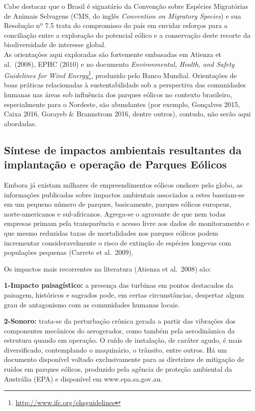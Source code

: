 \documentclass[
  oneside]{scrbook}
\DeclareRobustCommand{\href}[2]{#2\footnote{\url{#1}}}
\begin{document}
Cabe destacar que o Brasil é signatário da Convenção sobre Espécies Migratórias de Animais Selvagens (CMS, do inglês \emph{Convention on Migratory Species}) e sua Resolução nº 7.5 trata do compromisso do país em envidar esforços para a conciliação entre a exploração do potencial eólico e a conservação deste recorte da biodiversidade de interesse global.\\
As orientações aqui exploradas são fortemente embasadas em Atienza et al.~(2008), EPHC (2010) e no documento \href{http://www.ifc.org/ehsguidelines}{\emph{Environmental, Health, and Safety Guidelines for Wind Energy}}, produzido pelo Banco Mundial. Orientações de boas práticas relacionadas à sustentabilidade sob a perspectiva das comunidades humanas nas áreas sob influência dos parques eólicos no contexto brasileiro, especialmente para o Nordeste, são abundantes (por exemplo, Gonçalves 2015, Caixa 2016, Gorayeb \& Brannstrom 2016, dentre outros), contudo, não serão aqui abordadas.

\hypertarget{sintese}{%
\subsection{Síntese de impactos ambientais resultantes da implantação e operação de Parques Eólicos}\label{sintese}}

Embora já existam milhares de empreendimentos eólicos onshore pelo globo, as informações publicadas sobre impactos ambientais associados a estes baseiam-se em um pequeno número de parques, basicamente, parques eólicos europeus, norte-americanos e sul-africanos. Agrega-se o agravante de que nem todas empresas primam pela transparência e acesso livre aos dados de monitoramento e que mesmo reduzidas taxas de mortalidades nos parques eólicos podem incrementar consideravelmente o risco de extinção de espécies longevas com populações pequenas (Carrete et al.~2009).

Os impactos mais recorrentes na literatura (Atienza et al.~2008) são:

\textbf{1-Impacto paisagístico:} a presença das turbinas em pontos destacados da paisagem, históricos e sagrados pode, em certas circunstâncias, despertar algum grau de antagonismo com as comunidades humanas locais.

\textbf{2-Sonoro:} trata-se da perturbação crônica gerada a partir das vibrações dos componentes mecânicos do aerogerador, como também pela aerodinâmica da estrutura quando em operação. O ruído de instalação, de caráter agudo, é mais diversificado, contemplando o maquinário, o trânsito, entre outros. Há um documento disponível voltado exclusivamente para as diretrizes de mitigação de ruídos em parques eólicos, produzido pela agência de proteção ambiental da Austrália (EPA) e disponível em www.epa.sa.gov.au.
\end{document}
